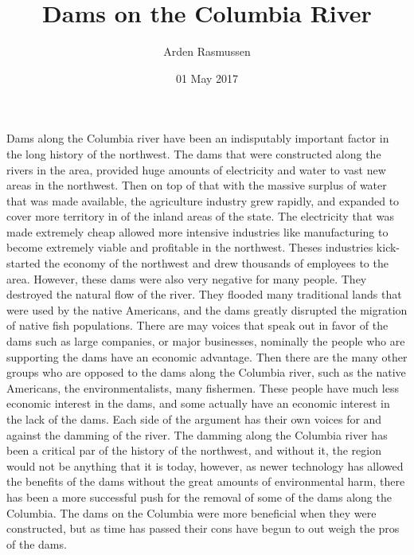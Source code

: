 \documentclass[12pt,twoside]{article}
\title{Dams on the Columbia River}
\author{Arden Rasmussen}
\date{01 May 2017}
\begin{document}
\maketitle
\newpage
{}

Dams along the Columbia river have been an indisputably important factor in the
long history of the northwest. The dams that were constructed along the rivers
in the area, provided huge amounts of electricity and water to vast new areas
in the northwest. Then on top of that with the massive surplus of water that
was made available, the agriculture industry grew rapidly, and expanded to
cover more territory in of the inland areas of the state. The electricity that
was made extremely cheap allowed more intensive industries like manufacturing
to become extremely viable and profitable in the northwest. Theses industries
kick-started the economy of the northwest and drew thousands of employees to
the area. However, these dams were also very negative for many people. They
destroyed the natural flow of the river. They flooded many traditional lands
that were used by the native Americans, and the dams greatly disrupted the
migration of native fish populations. There are may voices that speak out in
favor of the dams such as large companies, or major businesses, nominally the
people who are supporting the dams have an economic advantage. Then there are
the many other groups who are opposed to the dams along the Columbia river,
such as the native Americans, the environmentalists, many fishermen. These
people have much less economic interest in the dams, and some actually have an
economic interest in the lack of the dams. Each side of the argument has their
own voices for and against the damming of the river. The damming along the
Columbia river has been a critical par of the history of the northwest, and
without it, the region would not be anything that it is today, however, as
newer technology has allowed the benefits of the dams without the great amounts
of environmental harm, there has been a more successful push for the removal of
some of the dams along the Columbia. The dams on the Columbia were more
beneficial when they were constructed, but as time has passed their cons have
begun to out weigh the pros of the dams.
\end{document}
